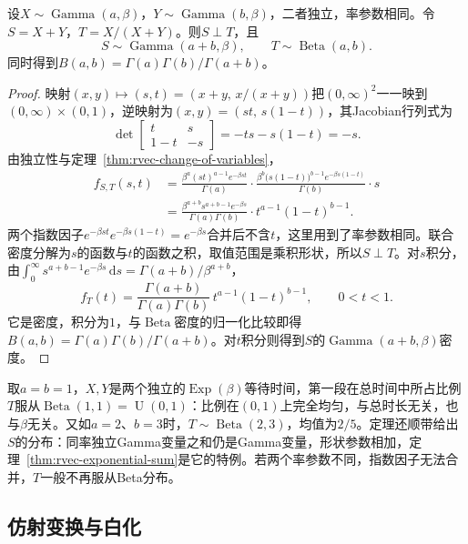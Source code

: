 \begin{theorem}[Gamma变量的和与比例]
\label{thm:rvec-gamma-beta}
设$X\sim\operatorname{Gamma}(a,\beta)$，$Y\sim\operatorname{Gamma}(b,\beta)$，二者独立，率参数相同。令$S=X+Y$，$T=X/(X+Y)$。则$S\perp T$，且
\[
 S\sim\operatorname{Gamma}(a+b,\beta),\qquad T\sim\operatorname{Beta}(a,b).
\]
同时得到$B(a,b)=\Gamma(a)\Gamma(b)/\Gamma(a+b)$。
\end{theorem}

\begin{proof}
映射$(x,y)\mapsto(s,t)=(x+y,\,x/(x+y))$把$(0,\infty)^2$一一映到$(0,\infty)\times(0,1)$，逆映射为$(x,y)=(st,\,s(1-t))$，其Jacobian行列式为
\[
 \det\begin{bmatrix}t&s\\1-t&-s\end{bmatrix}=-ts-s(1-t)=-s .
\]
由独立性与定理~\ref{thm:rvec-change-of-variables}，
\[
\begin{aligned}
 f_{S,T}(s,t)&=\frac{\beta^a(st)^{a-1}e^{-\beta st}}{\Gamma(a)}\cdot\frac{\beta^b\bigl(s(1-t)\bigr)^{b-1}e^{-\beta s(1-t)}}{\Gamma(b)}\cdot s\\
 &=\frac{\beta^{a+b}s^{a+b-1}e^{-\beta s}}{\Gamma(a)\Gamma(b)}\cdot t^{a-1}(1-t)^{b-1}.
\end{aligned}
\]
两个指数因子$e^{-\beta st}e^{-\beta s(1-t)}=e^{-\beta s}$合并后不含$t$，这里用到了率参数相同。联合密度分解为$s$的函数与$t$的函数之积，取值范围是乘积形状，所以$S\perp T$。对$s$积分，由$\int_0^\infty s^{a+b-1}e^{-\beta s}\,\mathrm ds=\Gamma(a+b)/\beta^{a+b}$，
\[
 f_T(t)=\frac{\Gamma(a+b)}{\Gamma(a)\Gamma(b)}\,t^{a-1}(1-t)^{b-1},\qquad 0<t<1 .
\]
它是密度，积分为$1$，与$\operatorname{Beta}$密度的归一化比较即得$B(a,b)=\Gamma(a)\Gamma(b)/\Gamma(a+b)$。对$t$积分则得到$S$的$\operatorname{Gamma}(a+b,\beta)$密度。
\end{proof}

取$a=b=1$，$X,Y$是两个独立的$\operatorname{Exp}(\beta)$等待时间，第一段在总时间中所占比例$T$服从$\operatorname{Beta}(1,1)=\operatorname{U}(0,1)$：比例在$(0,1)$上完全均匀，与总时长无关，也与$\beta$无关。又如$a=2$、$b=3$时，$T\sim\operatorname{Beta}(2,3)$，均值为$2/5$。定理还顺带给出$S$的分布：同率独立Gamma变量之和仍是Gamma变量，形状参数相加，定理~\ref{thm:rvec-exponential-sum}是它的特例。若两个率参数不同，指数因子无法合并，$T$一般不再服从Beta分布。

\subsection{仿射变换与白化}
\label{sec:rvec-affine-whitening}

